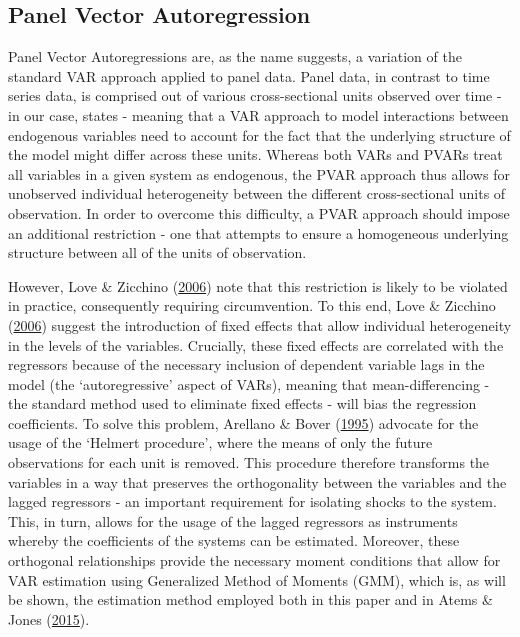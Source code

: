 \documentclass[11pt,preprint, authoryear]{elsarticle}
\numberwithin{equation}{section}
\numberwithin{figure}{section}
\numberwithin{table}{section}
\begin{document}
\hypertarget{panel-vector-autoregression}{%
\subsection{\texorpdfstring{Panel Vector Autoregression
\label{Section 2.1}}{Panel Vector Autoregression }}\label{panel-vector-autoregression}}

Panel Vector Autoregressions are, as the name suggests, a variation of
the standard VAR approach applied to panel data. Panel data, in contrast
to time series data, is comprised out of various cross-sectional units
observed over time - in our case, states - meaning that a VAR approach
to model interactions between endogenous variables need to account for
the fact that the underlying structure of the model might differ across
these units. Whereas both VARs and PVARs treat all variables in a given
system as endogenous, the PVAR approach thus allows for unobserved
individual heterogeneity between the different cross-sectional units of
observation. In order to overcome this difficulty, a PVAR approach
should impose an additional restriction - one that attempts to ensure a
homogeneous underlying structure between all of the units of
observation.

However, Love \& Zicchino (\protect\hyperlink{ref-love}{2006}) note that
this restriction is likely to be violated in practice, consequently
requiring circumvention. To this end, Love \& Zicchino
(\protect\hyperlink{ref-love}{2006}) suggest the introduction of fixed
effects that allow individual heterogeneity in the levels of the
variables. Crucially, these fixed effects are correlated with the
regressors because of the necessary inclusion of dependent variable lags
in the model (the `autoregressive' aspect of VARs), meaning that
mean-differencing - the standard method used to eliminate fixed effects
- will bias the regression coefficients. To solve this problem, Arellano
\& Bover (\protect\hyperlink{ref-arellano}{1995}) advocate for the usage
of the `Helmert procedure', where the means of only the future
observations for each unit is removed. This procedure therefore
transforms the variables in a way that preserves the orthogonality
between the variables and the lagged regressors - an important
requirement for isolating shocks to the system. This, in turn, allows
for the usage of the lagged regressors as instruments whereby the
coefficients of the systems can be estimated. Moreover, these orthogonal
relationships provide the necessary moment conditions that allow for VAR
estimation using Generalized Method of Moments (GMM), which is, as will
be shown, the estimation method employed both in this paper and in Atems
\& Jones (\protect\hyperlink{ref-atems}{2015}).
\end{document}
